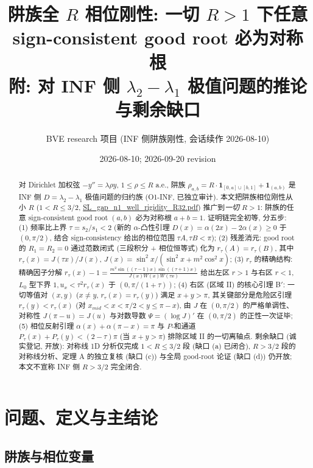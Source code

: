 \documentclass[UTF8]{ctexart}
\title{阱族全 $R$ 相位刚性: 一切 $R>1$ 下任意 sign-consistent good root 必为对称根\\[-2mm]
\large 附: 对 INF 侧 $\lambda_2-\lambda_1$ 极值问题的推论与剩余缺口}
\author{BVE research 项目 (INF 侧阱族刚性, 会话续作 2026-08-10)}
\date{2026-08-10; 2026-09-20 revision}
\begin{document}
\maketitle

\begin{abstract}
对 Dirichlet 加权弦 $-y''=\lambda\rho y$, $1\le\rho\le R$ a.e., 阱族
$\rho_{a,b}=R\cdot\mathbf 1_{[0,a]\cup[b,1]}+\mathbf 1_{(a,b)}$ 是 INF 侧 $D=\lambda_2-\lambda_1$
极值问题的归约族 (O1-INF, 已独立审计). 本文把阱族相位刚性从小 $R$ ($1<R\le3/2$,
\url{SL\_gap\_n1\_well\_rigidity\_R32.pdf}) 推广到\emph{一切} $R>1$:
阱族的任意 sign-consistent good root $(a,b)$ 必为对称根 $a+b=1$.
证明链完全初等, 分五步:
(1) 频率比上界 $\tau=s_2/s_1<2$ (新的 $\alpha$-凸性引理 $D(x)=\alpha(2x)-2\alpha(x)\ge0$ 于
$(0,\pi/2)$, 结合 sign-consistency 给出的相位范围 $\tau A,\tau B<\pi$);
(2) 残差消元: good root 的 $R_1=R_2=0$ 通过范数闭式 (三段积分 + 相位恒等式) 化为
$r_\tau(A)=r_\tau(B)$, 其中 $r_\tau(x)=J(\tau x)/J(x)$, $J(x)=\sin^2x/(\sin^2x+m^2\cos^2x)$;
(3) $r_\tau$ 的精确结构: 精确因子分解
$r_\tau(x)-1=\frac{m^2\sin((\tau-1)x)\sin((\tau+1)x)}{J(x)W(x)W(\tau x)}$ 给出左区 $r>1$ 与右区 $r<1$,
$L_0$ 型下界 $1,u_x<\tau^2r_\tau(x)$ 于 $(0,\pi/(1+\tau))$;
(4) 右区 (区域 II) 的核心引理 B$'$: 一切等值对 $(x,y)$ ($x\ne y$, $r_\tau(x)=r_\tau(y)$) 满足
$x+y>\pi$, 其关键部分是危险区引理 $r_\tau(y)<r_\tau(x)$ (对
$x_{mid}<x<\pi/2<y\le\pi-x$), 由 $J$ 在 $(0,\pi/2)$ 的严格单调性、对称性
$J(\pi-u)=J(u)$ 与对数导数 $\Psi=(\log J)'$ 在 $(0,\pi/2)$ 的正性一次证毕;
(5) 相位反射引理 $\alpha(x)+\alpha(\pi-x)=\pi$ 与 $P$-和通道
$P_\tau(x)+P_\tau(y)<(2-\tau)\pi$ (当 $x+y>\pi$) 排除区域 II 的一切离轴点.
剩余缺口 (诚实登记, 开放): 对称线 1D 分析仅完成 $1<R\le3/2$ 段 (缺口 (a) 已闭合),
$R>3/2$ 段的对称线分析、定理 A 的独立复核 (缺口 (c)) 与全局 good-root 论证 (缺口 (d))
仍开放; 本文不宣称 INF 侧 $R>3/2$ 完全闭合.
\end{abstract}

\tableofcontents

\section{问题、定义与主结论}\label{sec:setup}

\subsection{阱族与相位变量}
\end{document}
